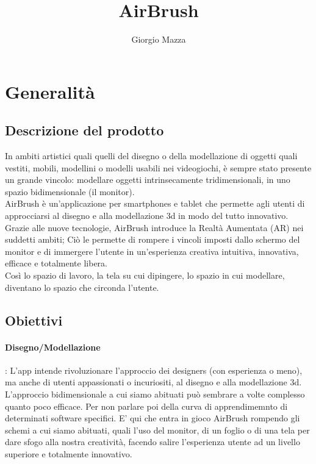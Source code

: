 \documentclass[a4paper, twoside]{article}
\title{AirBrush}
\author{Giorgio Mazza}
\begin{document}
\maketitle
\newpage
\tableofcontents
\newpage

\section{Generalità}
\subsection{Descrizione del prodotto}
In ambiti artistici quali quelli del disegno o della modellazione di oggetti quali vestiti, mobili, modellini o modelli usabili nei videogiochi, è sempre stato presente un grande vincolo: modellare oggetti intrinsecamente tridimensionali, in uno spazio bidimensionale (il monitor).\\
AirBrush è un'applicazione per smartphones e tablet che permette agli utenti di approcciarsi al disegno e alla modellazione 3d in modo del tutto innovativo. \\
Grazie alle nuove tecnologie, AirBrush introduce la Realtà Aumentata (AR) nei suddetti ambiti; Ciò le permette di rompere i vincoli imposti dallo schermo del monitor e di immergere l'utente in un'esperienza creativa intuitiva, innovativa, efficace e totalmente libera.\\
Così lo spazio di lavoro, la tela su cui dipingere, lo spazio in cui modellare, diventano lo spazio che circonda l'utente.

\subsection{Obiettivi}
\paragraph{Disegno/Modellazione}: L'app intende rivoluzionare l'approccio dei designers (con esperienza o meno), ma anche di utenti appassionati o incuriositi, al disegno e alla modellazione 3d. \\
L'approccio bidimensionale a cui siamo abituati può sembrare a volte complesso quanto poco efficace. Per non parlare poi della curva di apprendimemnto di determinati software specifici. E' qui che entra in gioco AirBrush rompendo gli schemi a cui siamo abituati, quali l'uso del monitor, di un foglio o di una tela per dare sfogo alla nostra creatività, facendo salire l'esperienza utente ad un livello superiore e totalmente innovativo.
\end{document}
